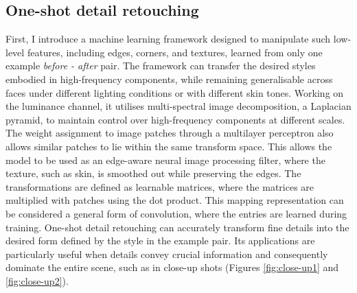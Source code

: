 \subsection{One-shot detail retouching}
First, I introduce a machine learning framework designed to manipulate such low-level features, including edges, corners, and textures, learned from only one example \textit{before - after} pair. The framework can transfer the desired styles embodied in high-frequency components, while remaining generalisable across faces under different lighting conditions or with different skin tones. Working on the luminance channel, it utilises multi-spectral image decomposition, a Laplacian pyramid, to maintain control over high-frequency components at different scales. The weight assignment to image patches through a multilayer perceptron also allows similar patches to lie within the same transform space. This allows the model to be used as an edge-aware neural image processing filter, where the texture, such as skin, is smoothed out while preserving the edges. The transformations are defined as learnable matrices, where the matrices are multiplied with patches using the dot product. This mapping representation can be considered a general form of convolution, where the entries are learned during training. One-shot detail retouching can accurately transform fine details into the desired form defined by the style in the example pair. Its applications are particularly useful when details convey crucial information and consequently dominate the entire scene, such as in close-up shots (Figures \ref{fig:close-up1} and \ref{fig:close-up2}).





